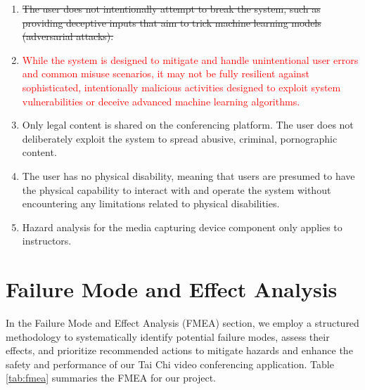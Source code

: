 \documentclass{article}
\begin{document}
\begin{enumerate}
\item \sout{The user does not intentionally attempt to break the system, such as
providing deceptive inputs that aim to trick machine learning models
(adversarial attacks).}
\item \textcolor{red}{While the system is designed to mitigate and handle unintentional 
  user errors and common misuse scenarios, it may not be fully resilient against 
  sophisticated, intentionally malicious activities designed to exploit system 
  vulnerabilities or deceive advanced machine learning algorithms.}
\item Only legal content is shared on the conferencing platform. The user does not
  deliberately exploit the system to spread abusive, criminal, pornographic
  content.
\item The user has no physical disability, meaning that users are presumed to have
  the physical capability to interact with and operate the system without
  encountering any limitations related to physical disabilities.
\item Hazard analysis for the media capturing device component only applies to
  instructors.
\end{enumerate}


\section{Failure Mode and Effect Analysis}

In the Failure Mode and Effect Analysis (FMEA) section, we employ a structured
methodology to systematically identify potential failure modes, assess their
effects, and prioritize recommended actions to mitigate hazards and enhance the
safety and performance of our Tai Chi video conferencing application. Table
\ref{tab:fmea} summaries the FMEA for our project.
\end{document}
